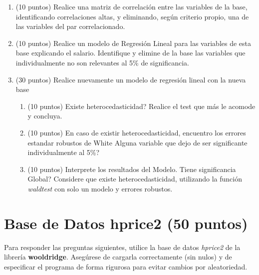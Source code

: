 \documentclass[letterpaper,11pt]{article}
\begin{document}
\begin{enumerate}

\item (10 puntos) Realice una matriz de correlación entre las variables de la base, identificando correlaciones altas, y eliminando, según criterio propio, una de las variables del par correlacionado.




    \item (10 puntos) Realice un modelo de Regresión Lineal para las variables de esta base explicando el salario. Identifique y elimine de la base las variables que individualmente no son relevantes al 5\% de significancia. 
    


    \item (30 puntos) Realice nuevamente un modelo de regresión lineal con la nueva base 
    \begin{enumerate}
        \item  (10 puntos) \textquestiondown Existe heterocedasticidad? Realice el test que más le acomode y concluya.

        \item (10 puntos) En caso de existir heterocedasticidad, encuentro los errores estandar robustos de White \textquestiondown Alguna variable que dejo de ser significante individualmente al 5\%?

        \item (10 puntos) Interprete los resultados del Modelo. \textquestiondown Tiene significancia Global? Considere que existe heterocedasticidad, utilizando la función \textit{waldtest} con solo un modelo y errores robustos. 
       
    \end{enumerate} 
\end{enumerate}

\section{Base de Datos hprice2 (50 puntos)}

Para responder las preguntas siguientes, utilice la base de datos \textit{hprice2} de la librería \textbf{wooldridge}. Asegúrese de cargarla correctamente (sin nulos) y de especificar el programa de forma rigurosa para evitar cambios por aleatoriedad.
\end{document}

